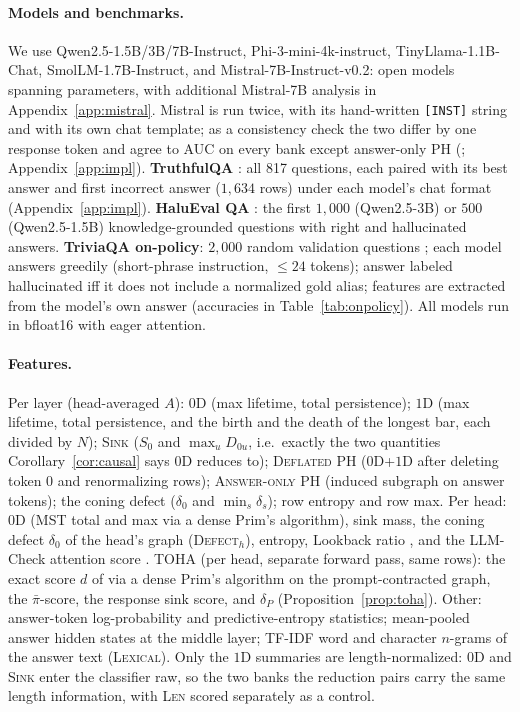 \documentclass{article}
\theoremstyle{definition}
\newcommand{\defect}{\delta}
\newcommand{\stw}{S}
\begin{document}
\paragraph{Models and benchmarks.} We use Qwen2.5-1.5B/3B/7B-Instruct, Phi-3-mini-4k-instruct, TinyLlama-1.1B-Chat, SmolLM-1.7B-Instruct, and Mistral-7B-Instruct-v0.2: \NModels{} open models spanning \ModelSizeRange{} parameters, with additional Mistral-7B analysis in Appendix~\ref{app:mistral}. Mistral is run twice, with its hand-written \texttt{[INST]} string and with its own chat template; as a consistency check the two differ by one response token and agree to \MistralFmtOtherGap{} AUC on every bank except answer-only PH (\MistralFmtAnsGap{}; Appendix~\ref{app:impl}). \textbf{TruthfulQA} \citep{lin2022truthfulqa}: all 817 questions, each paired with its best answer and first incorrect answer ($1{,}634$ rows) under each model's chat format (Appendix~\ref{app:impl}). \textbf{HaluEval QA} \citep{li2024halueval}: the first $1{,}000$ (Qwen2.5-3B) or $500$ (Qwen2.5-1.5B) knowledge-grounded questions with right and hallucinated answers. \textbf{TriviaQA on-policy}: $2{,}000$ random validation questions \citep{joshi2017triviaqa}; each model answers greedily (short-phrase instruction, $\le24$ tokens); answer labeled hallucinated iff it does not include a normalized gold alias; features are extracted from the model's own answer (accuracies in Table~\ref{tab:onpolicy}). All models run in bfloat16 with eager attention.

\paragraph{Features.} Per layer (head-averaged $A$): $0$D (max lifetime, total persistence); $1$D (max lifetime, total persistence, and the birth and the death of the longest bar, each divided by $N$); \textsc{Sink} ($\stw_0$ and $\max_u D_{0u}$, i.e.\ exactly the two quantities Corollary~\ref{cor:causal} says $0$D reduces to); \textsc{Deflated} PH ($0$D+$1$D after deleting token 0 and renormalizing rows); \textsc{Answer-only} PH (induced subgraph on answer tokens); the coning defect ($\defect_0$ and $\min_s\defect_s$); row entropy and row max. Per head: $0$D (MST total and max via a dense Prim's algorithm), sink mass, the coning defect $\defect_0$ of the head's graph (\textsc{Defect}$_h$), entropy, Lookback ratio \citep{chuang2024lookback}, and the LLM-Check attention score \citep{sriramanan2024llmcheck}. \textsc{TOHA} (per head, separate forward pass, same rows): the exact score $d$ of \citet{toha} via a dense Prim's algorithm on the prompt-contracted graph, the $\bar\pi$-score, the response sink score, and $\defect_P$ (Proposition~\ref{prop:toha}). Other: answer-token log-probability and predictive-entropy statistics; mean-pooled answer hidden states at the middle layer; TF-IDF word and character $n$-grams of the answer text (\textsc{Lexical}). Only the $1$D summaries are length-normalized: $0$D and \textsc{Sink} enter the classifier raw, so the two banks the reduction pairs carry the same length information, with \textsc{Len} scored separately as a control.
\end{document}
